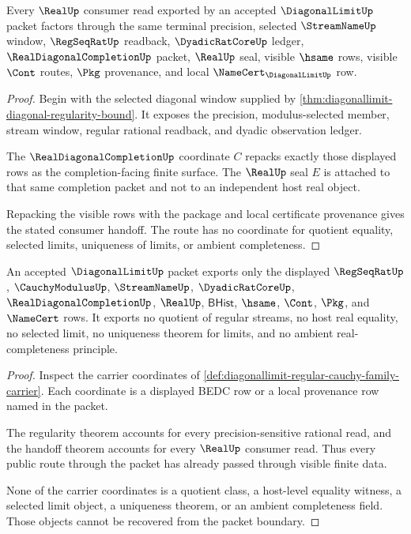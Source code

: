 \begin{theorem}
\label{thm:diagonallimit-real-cauchy-handoff-boundary}
Every $\RealUp$ consumer read exported by an accepted $\DiagonalLimitUp$ packet factors through the same terminal precision, selected $\StreamNameUp$ window, $\RegSeqRatUp$ readback, $\DyadicRatCoreUp$ ledger, $\RealDiagonalCompletionUp$ packet, $\RealUp$ seal, visible $\hsame$ rows, visible $\Cont$ routes, $\Pkg$ provenance, and local $\NameCert_{\DiagonalLimitUp}$ row.
\end{theorem}
\begin{proof}
Begin with the selected diagonal window supplied by \autoref{thm:diagonallimit-diagonal-regularity-bound}. It exposes the precision, modulus-selected member, stream window, regular rational readback, and dyadic observation ledger.

The $\RealDiagonalCompletionUp$ coordinate $C$ repacks exactly those displayed rows as the completion-facing finite surface. The $\RealUp$ seal $E$ is attached to that same completion packet and not to an independent host real object.

Repacking the visible rows with the package and local certificate provenance gives the stated consumer handoff. The route has no coordinate for quotient equality, selected limits, uniqueness of limits, or ambient completeness.
\end{proof}

\begin{theorem}
\label{thm:diagonallimit-non-escape-boundary}
An accepted $\DiagonalLimitUp$ packet exports only the displayed $\RegSeqRatUp$, $\CauchyModulusUp$, $\StreamNameUp$, $\DyadicRatCoreUp$, $\RealDiagonalCompletionUp$, $\RealUp$, $\mathsf{BHist}$, $\hsame$, $\Cont$, $\Pkg$, and $\NameCert$ rows. It exports no quotient of regular streams, no host real equality, no selected limit, no uniqueness theorem for limits, and no ambient real-completeness principle.
\end{theorem}
\begin{proof}
Inspect the carrier coordinates of \autoref{def:diagonallimit-regular-cauchy-family-carrier}. Each coordinate is a displayed BEDC row or a local provenance row named in the packet.

The regularity theorem accounts for every precision-sensitive rational read, and the handoff theorem accounts for every $\RealUp$ consumer read. Thus every public route through the packet has already passed through visible finite data.

None of the carrier coordinates is a quotient class, a host-level equality witness, a selected limit object, a uniqueness theorem, or an ambient completeness field. Those objects cannot be recovered from the packet boundary.
\end{proof}

